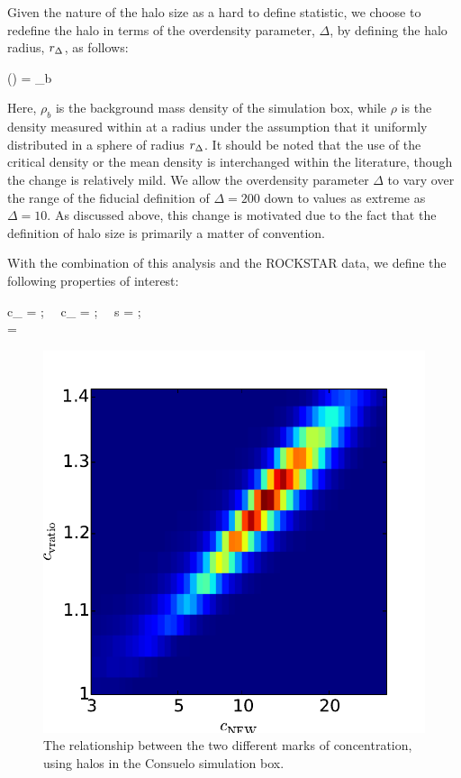 \documentclass[usenatbib,usegraphicx,letterpaper]{mn2e}
\begin{document}
Given the nature of the halo size as a hard to define statistic, we choose to redefine the halo in terms of the overdensity parameter, $\Delta$, by defining the halo radius, $r_{\Delta}$, as follows:

\beq
	\rho(\Rdel) = \Delta \rho_b
\eeq

Here, $\rho_b$ is the background mass density of the simulation box, while $\rho$ is the density measured within at a radius under the assumption that it uniformly distributed in a sphere of radius $r_{\Delta}$. It should be noted that the use of the critical density or the mean density is interchanged within the literature, though the change is relatively mild. We allow the overdensity parameter $\Delta$ to vary over the range of the fiducial definition of $\Delta = 200$ down to values as extreme as $\Delta = 10$. As discussed above, this change is motivated due to the fact that the definition of halo size is primarily a matter of convention.

With the combination of this analysis and the ROCKSTAR data, we define the following properties of interest:

\beq
	c_{} =  ; \ \ c_{} = ; \ \ s = ; \\ \Lambda =  \\
\eeq

\begin{figure}
	\centering
		\includegraphics[width=.5\textwidth]{ldcompare_cnfwvscvrat_z00.pdf}
	\caption{The relationship between the two different marks of concentration, using halos in the Consuelo simulation box.}
\end{figure}

\end{document}
